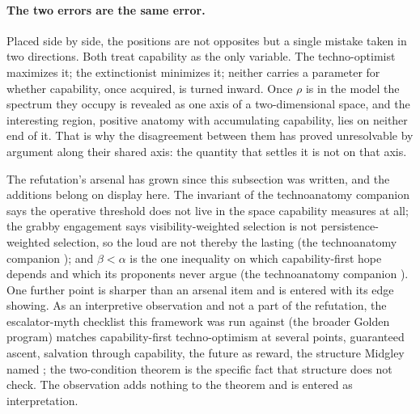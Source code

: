 \paragraph{The two errors are the same error.}\label{hr:rem:sameerror}
Placed side by side, the positions are not opposites but a single
mistake taken in two directions. Both treat capability as the only
variable. The techno-optimist maximizes it; the extinctionist minimizes
it; neither carries a parameter for whether capability, once acquired,
is turned inward. Once $\rho$ is in the model the spectrum they occupy
is revealed as one axis of a two-dimensional space, and the interesting
region, positive anatomy with accumulating capability, lies on
neither end of it. That is why the disagreement between them has proved
unresolvable by argument along their shared axis: the quantity that
settles it is not on that axis.


The refutation's arsenal has grown since this subsection was written,
and the additions belong on display here. The invariant of
the technoanatomy companion \cite{GoldenTechnoanatomy} says the operative threshold does not
live in the space capability measures at all; the grabby engagement
says visibility-weighted selection is not persistence-weighted
selection, so the loud are not thereby the lasting
(the technoanatomy companion \cite{GoldenTechnoanatomy}); and $\beta<\alpha$ is the one
inequality on which capability-first hope depends and which its
proponents never argue (the technoanatomy companion \cite{GoldenTechnoanatomy}). One further
point is sharper than an arsenal item and is entered with its edge
showing. As an interpretive observation and not a part of the refutation, the
escalator-myth checklist this framework was run against
(the broader Golden program) matches capability-first techno-optimism
at several points, guaranteed ascent, salvation through capability,
the future as reward, the structure Midgley named \cite{Midgley85};
the two-condition theorem is the specific fact that structure does not
check. The observation adds nothing to the theorem and is entered as
interpretation.

